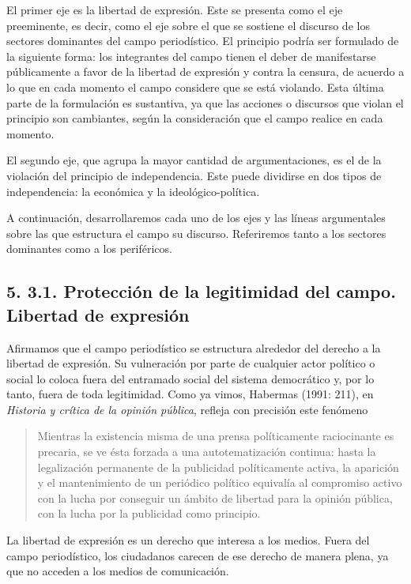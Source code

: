 El primer eje es la libertad de expresión. Este se presenta como el eje preeminente, es decir, como el eje sobre el que se sostiene el discurso de los sectores dominantes del campo periodístico. El principio podría ser formulado de la siguiente forma: los integrantes del campo tienen el deber de manifestarse públicamente a favor de la libertad de expresión y contra la censura, de acuerdo a lo que en cada momento el campo considere que se está violando. Esta última parte de la formulación es sustantiva, ya que las acciones o discursos que violan el principio son cambiantes, según la consideración que el campo realice en cada momento.

El segundo eje, que agrupa la mayor cantidad de argumentaciones, es el de la violación del principio de independencia. Este puede dividirse en dos tipos de independencia: la económica y la ideológico-política.

A continuación, desarrollaremos cada uno de los ejes y las líneas argumentales sobre las que estructura el campo su discurso. Referiremos tanto a los sectores dominantes como a los periféricos.


\subsection{5. 3.1. Protección de la legitimidad del campo. Libertad de expresión}

Afirmamos que el campo periodístico se estructura alrededor del derecho a la libertad de expresión. Su vulneración por parte de cualquier actor político o social lo coloca fuera del entramado social del sistema democrático y, por lo tanto, fuera de toda legitimidad. Como ya vimos, Habermas (1991: 211), en \emph{Historia y crítica de la opinión pública}, refleja con precisión este fenómeno

\begin{quote}
Mientras la existencia misma de una prensa políticamente raciocinante es precaria, se ve ésta forzada a una autotematización continua: hasta la legalización permanente de la publicidad políticamente activa, la aparición y el mantenimiento de un periódico político equivalía al compromiso activo con la lucha por conseguir un ámbito de libertad para la opinión pública, con la lucha por la publicidad como principio.
\end{quote}

La libertad de expresión es un derecho que interesa a los medios. Fuera del campo periodístico, los ciudadanos carecen de ese derecho de manera plena, ya que no acceden a los medios de comunicación.

